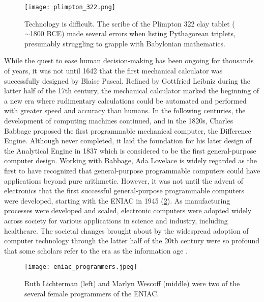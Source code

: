 \begin{figure}[t]
    \centering
    \texttt{[image: plimpton\_322.png]}
    \caption{Technology is difficult. The scribe of the Plimpton 322 clay tablet ($\sim$1800 BCE) made several errors when listing Pythagorean triplets, presumably struggling to grapple with Babylonian mathematics.}
    \label{fig:plimpton_332}
\end{figure}

While the quest to ease human decision-making has been ongoing for thousands of years, it was not until 1642 that the first mechanical calculator was successfully designed by Blaise Pascal. Refined by Gottfried Leibniz during the latter half of the 17th century, the mechanical calculator marked the beginning of a new era where rudimentary calculations could be automated and performed with greater speed and accuracy than humans. 
In the following centuries, the development of computing machines continued, and in the 1820s, Charles Babbage proposed the first programmable mechanical computer, the Difference Engine. Although never completed, it laid the foundation for his later design of the Analytical Engine in 1837 which is considered to be the first general-purpose computer design. 
Working with Babbage, Ada Lovelace is widely regarded as the first to have recognized that general-purpose programmable computers could have applications beyond pure arithmetic. However, it was not until the advent of electronics that the first successful general-purpose programmable computers were developed, starting with the ENIAC in 1945 (\cref{fig:eniac_programmers}).
As manufacturing processes were developed and scaled, electronic computers were adopted widely across society for various applications in science and industry, including healthcare. 
The societal changes brought about by the widespread adoption of computer technology through the latter half of the 20th century were so profound that some scholars refer to the era as the information age \cite{georges_universal_2001, harari_sapiens_2011}.

\begin{figure}[t]
    \centering
    \texttt{[image: eniac\_programmers.jpeg]}
    \caption{Ruth Lichterman (left) and Marlyn Wescoff (middle) were two of the several female programmers of the ENIAC.} %
    \label{fig:eniac_programmers}
\end{figure}

